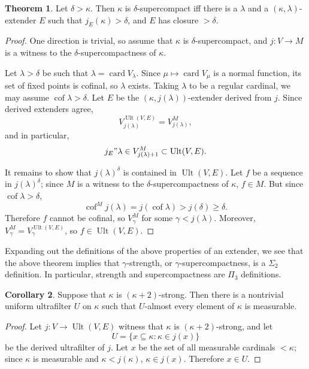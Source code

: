 \documentclass[12pt]{report}
\newcommand{\card}{\operatorname{card}}
\DeclareMathOperator{\cof}{cof}
\DeclareMathOperator{\Ult}{Ult}
\theoremstyle{definition}
\newtheorem{theorem}{Theorem}[chapter]
\newtheorem{corollary}[theorem]{Corollary}
\begin{document}
\begin{theorem}
Let $\delta > \kappa$. Then $\kappa$ is $\delta$-supercompact iff there is a $\lambda$ and a $(\kappa, \lambda)$-extender $E$ such that $j_E(\kappa) > \delta$, and $E$ has closure $> \delta$.
\end{theorem}
\begin{proof}
One direction is trivial, so assume that $\kappa$ is $\delta$-supercompact, and $j: V \to M$ is a witness to the $\delta$-supercompactness of $\kappa$.

Let $\lambda > \delta$ be such that $\lambda = \card V_\lambda$. Since $\mu \mapsto \card V_\mu$ is a normal function, its set of fixed points is cofinal, so $\lambda$ exists.
Taking $\lambda$ to be a regular cardinal, we may assume $\cof \lambda > \delta$.
Let $E$ be the $(\kappa, j(\lambda))$-extender derived from $j$.
Since derived extenders agree,
$$V_{j(\lambda)}^{\Ult(V, E)} = V^M_{j(\lambda)},$$
and in particular,
$$j_E"\lambda \in V^M_{j(\lambda) + 1} \subset \Ult(V, E).$$

It remains to show that $j(\lambda)^\delta$ is contained in $\Ult(V, E)$.
Let $f$ be a sequence in $j(\lambda)^\delta$; since $M$ is a witness to the $\delta$-supercompactness of $\kappa$, $f \in M$.
But since $\cof \lambda > \delta$,
$$\cof^M j(\lambda) = j(\cof \lambda) > j(\delta) \geq \delta.$$
Therefore $f$ cannot be cofinal, so $V_\gamma^M$ for some $\gamma < j(\lambda)$. Moreover, $V_\gamma^M = V_\gamma^{\Ult(V, E)}$, so $f \in \Ult(V, E)$.
\end{proof}

Expanding out the definitions of the above properties of an extender, we see that the above theorem implies that $\gamma$-strength, or $\gamma$-supercompactness, is a $\Sigma_2$ definition.
In particular, strength and supercompactness are $\Pi_3$ definitions.

\begin{corollary}
Suppose that $\kappa$ is $(\kappa + 2)$-strong. Then there is a nontrivial uniform ultrafilter $U$ on $\kappa$ such that $U$-almost every element of $\kappa$ is measurable.
\end{corollary}
\begin{proof}
Let $j: V \to \Ult(V, E)$ witness that $\kappa$ is $(\kappa + 2)$-strong, and let
$$U = \{x \subseteq \kappa: \kappa \in j(x)\}$$
be the derived ultrafilter of $j$. Let $x$ be the set of all measurable cardinals $< \kappa$; since $\kappa$ is measurable and $\kappa < j(\kappa)$, $\kappa \in j(x)$.
Therefore $x \in U$.
\end{proof}
\end{document}
